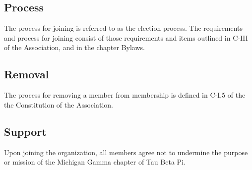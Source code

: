 \subsection{Process} \label{IV.3}
The process for joining is referred to as the election process.
The requirements and process for joining consist of those requirements and items outlined in C-III of the Association, and in the chapter Bylaws.

\subsection{Removal} \label{IV.4}
The process for removing a member from membership is defined in C-I,5 of the the Constitution of the Association.

\subsection{Support} \label{IV.5}
Upon joining the organization, all members agree not to undermine the purpose or mission of the Michigan Gamma chapter of Tau Beta Pi.